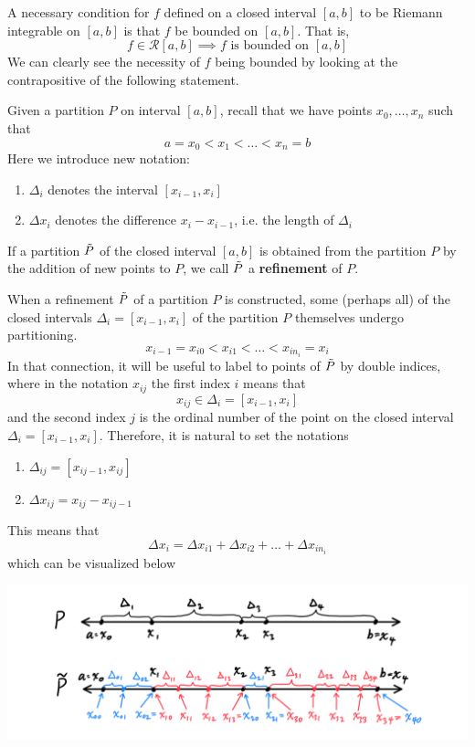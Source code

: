 \documentclass{article}
\begin{document}
      \begin{theorem}
      A necessary condition for $f$ defined on a closed interval $[a, b]$ to be Riemann integrable on $[a, b]$ is that $f$ be bounded on $[a, b]$. That is, 
      \[f \in \mathcal{R}[a, b] \implies f \text{ is bounded on } [a, b]\]
      We can clearly see the necessity of $f$ being bounded by looking at the contrapositive of the following statement. 
      \end{theorem}

      \begin{theorem}[Refinement]
      Given a partition $P$ on interval $[a, b]$, recall that we have points $x_0, \ldots, x_n$ such that
      \[a = x_0 < x_1 < \ldots < x_n = b\]
      Here we introduce new notation: 
      \begin{enumerate}
        \item $\Delta_i$ denotes the interval $[x_{i-1}, x_i]$
        \item $\Delta x_i$ denotes the difference $x_i - x_{i-1}$, i.e. the length of $\Delta_i$
      \end{enumerate}
      If a partition $\Tilde{P}$ of the closed interval $[a, b]$ is obtained from the partition $P$ by the addition of new points to $P$, we call $\Tilde{P}$ a \textbf{refinement} of $P$. 

      When a refinement $\Tilde{P}$ of a partition $P$ is constructed, some (perhaps all) of the closed intervals $\Delta_i = [x_{i-1}, x_i]$ of the partition $P$ themselves undergo partitioning. 
      \[x_{i-1} = x_{i0} < x_{i1} < \ldots < x_{in_i} = x_i\]
      In that connection, it will be useful to label to points of $\Tilde{P}$ by double indices, where in the notation $x_{ij}$ the first index $i$ means that 
      \[x_{ij} \in \Delta_i = [x_{i-1}, x_i]\]
      and the second index $j$ is the ordinal number of the point on the closed interval $\Delta_i = [x_{i-1}, x_i]$. Therefore, it is natural to set the notations
      \begin{enumerate}
        \item $\Delta_{ij} = [x_{i j-1}, x_{ij}]$
        \item $\Delta x_{ij} = x_{ij} - x_{ij-1}$
      \end{enumerate}
      This means that 
      \[\Delta x_i = \Delta x_{i1} + \Delta x_{i2} + \ldots + \Delta x_{in_i}\]
      which can be visualized below
      \begin{center}
        \includegraphics[scale=0.25]{img/Refinement_Definition_Analysis.PNG}
      \end{center}
      \end{theorem}
\end{document}
